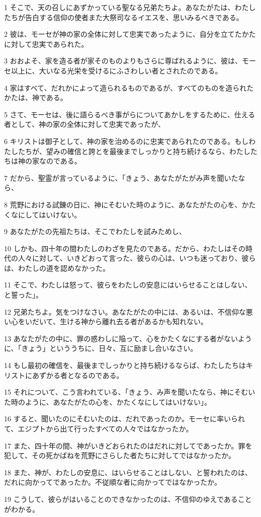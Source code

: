 \par 1 そこで、天の召しにあずかっている聖なる兄弟たちよ。あなたがたは、わたしたちが告白する信仰の使者また大祭司なるイエスを、思いみるべきである。
\par 2 彼は、モーセが神の家の全体に対して忠実であったように、自分を立てたかたに対して忠実であられた。
\par 3 おおよそ、家を造る者が家そのものよりもさらに尊ばれるように、彼は、モーセ以上に、大いなる光栄を受けるにふさわしい者とされたのである。
\par 4 家はすべて、だれかによって造られるものであるが、すべてのものを造られたかたは、神である。
\par 5 さて、モーセは、後に語らるべき事がらについてあかしをするために、仕える者として、神の家の全体に対して忠実であったが、
\par 6 キリストは御子として、神の家を治めるのに忠実であられたのである。もしわたしたちが、望みの確信と誇とを最後までしっかりと持ち続けるなら、わたしたちは神の家なのである。
\par 7 だから、聖霊が言っているように、「きょう、あなたがたがみ声を聞いたなら、
\par 8 荒野における試錬の日に、神にそむいた時のように、あなたがたの心を、かたくなにしてはいけない。
\par 9 あなたがたの先祖たちは、そこでわたしを試みためし、
\par 10 しかも、四十年の間わたしのわざを見たのである。だから、わたしはその時代の人々に対して、いきどおって言った、彼らの心は、いつも迷っており、彼らは、わたしの道を認めなかった。
\par 11 そこで、わたしは怒って、彼らをわたしの安息にはいらせることはしない、と誓った」。
\par 12 兄弟たちよ。気をつけなさい。あなたがたの中には、あるいは、不信仰な悪い心をいだいて、生ける神から離れ去る者があるかも知れない。
\par 13 あなたがたの中に、罪の惑わしに陥って、心をかたくなにする者がないように、「きょう」といううちに、日々、互に励まし合いなさい。
\par 14 もし最初の確信を、最後までしっかりと持ち続けるならば、わたしたちはキリストにあずかる者となるのである。
\par 15 それについて、こう言われている、「きょう、み声を聞いたなら、神にそむいた時のように、あなたがたの心を、かたくなにしてはいけない」。
\par 16 すると、聞いたのにそむいたのは、だれであったのか。モーセに率いられて、エジプトから出て行ったすべての人々ではなかったか。
\par 17 また、四十年の間、神がいきどおられたのはだれに対してであったか。罪を犯して、その死かばねを荒野にさらした者たちに対してではなかったか。
\par 18 また、神が、わたしの安息に、はいらせることはしない、と誓われたのは、だれに向かってであったか。不従順な者に向かってではなかったか。
\par 19 こうして、彼らがはいることのできなかったのは、不信仰のゆえであることがわかる。

